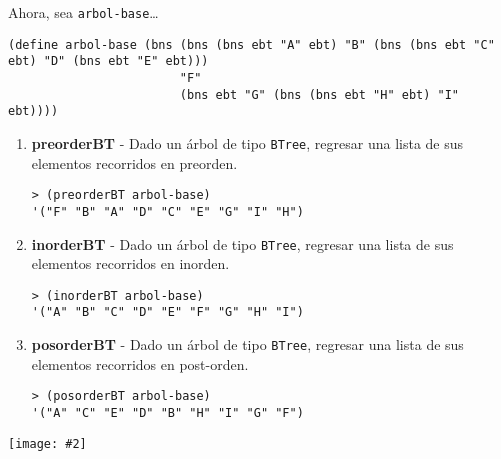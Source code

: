 \documentclass{article}
\newcommand{\jimage}[2]{\texttt{[image: \#2]}\vskip10pt}
\begin{document}
\newpage
\item  Ahora, sea \verb;arbol-base;\dots
\begin{verbatim}
(define arbol-base (bns (bns (bns ebt "A" ebt) "B" (bns (bns ebt "C" ebt) "D" (bns ebt "E" ebt))) 
                        "F"
                        (bns ebt "G" (bns (bns ebt "H" ebt) "I" ebt))))
\end{verbatim}

\begin{enumerate}
\item  \textbf{preorderBT} - Dado un árbol de tipo \verb;BTree;, regresar una lista de sus elementos recorridos en preorden.
\begin{verbatim}
> (preorderBT arbol-base)
'("F" "B" "A" "D" "C" "E" "G" "I" "H")
\end{verbatim}

\item  \textbf{inorderBT}  - Dado un árbol de tipo \verb;BTree;, regresar una lista de sus elementos recorridos en inorden.
\begin{verbatim}
> (inorderBT arbol-base)
'("A" "B" "C" "D" "E" "F" "G" "H" "I")
\end{verbatim}

\item \textbf{posorderBT} - Dado un árbol de tipo \verb;BTree;, regresar una lista de sus elementos recorridos en post-orden.
\begin{verbatim}
> (posorderBT arbol-base)
'("A" "C" "E" "D" "B" "H" "I" "G" "F")
\end{verbatim}
   
\end{enumerate}

\jimage{0.8}{orders.png}
\end{document}
